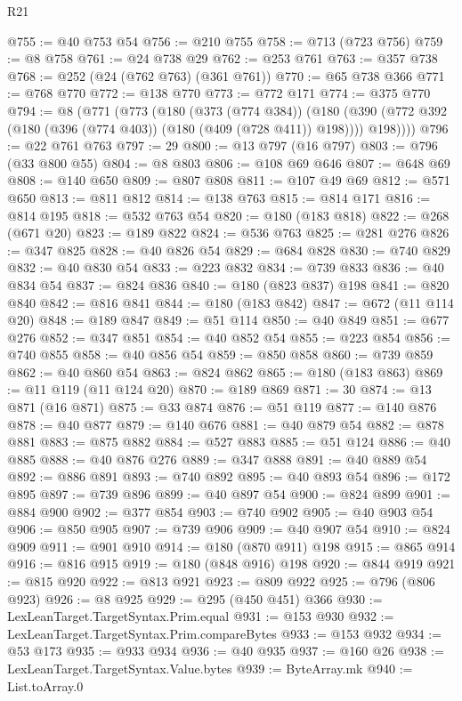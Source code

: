 \begin{lexlean}{R21}
\begin{coremodule}
@755 := @40 @753 @54
@756 := @210 @755
@758 := @713 (@723 @756)
@759 := @8 @758
@761 := @24 @738 @29
@762 := @253 @761
@763 := @357 @738
@768 := @252 (@24 (@762 @763) (@361 @761))
@770 := @65 @738 @366
@771 := @768 @770
@772 := @138 @770
@773 := @772 @171
@774 := @375 @770
@794 := @8
    (@771
      (@773
        (@180
          (@373 (@774 @384))
          (@180 (@390 (@772 @392 (@180 (@396 (@774 @403)) (@180 (@409 (@728 @411)) @198)))) @198))))
@796 := @22 @761 @763
@797 := 29
@800 := @13 @797 (@16 @797)
@803 := @796 (@33 @800 @55)
@804 := @8 @803
@806 := @108 @69 @646
@807 := @648 @69
@808 := @140 @650
@809 := @807 @808
@811 := @107 @49 @69
@812 := @571 @650
@813 := @811 @812
@814 := @138 @763
@815 := @814 @171
@816 := @814 @195
@818 := @532 @763 @54
@820 := @180 (@183 @818)
@822 := @268 (@671 @20)
@823 := @189 @822
@824 := @536 @763
@825 := @281 @276
@826 := @347 @825
@828 := @40 @826 @54
@829 := @684 @828
@830 := @740 @829
@832 := @40 @830 @54
@833 := @223 @832
@834 := @739 @833
@836 := @40 @834 @54
@837 := @824 @836
@840 := @180 (@823 @837) @198
@841 := @820 @840
@842 := @816 @841
@844 := @180 (@183 @842)
@847 := @672 (@11 @114 @20)
@848 := @189 @847
@849 := @51 @114
@850 := @40 @849
@851 := @677 @276
@852 := @347 @851
@854 := @40 @852 @54
@855 := @223 @854
@856 := @740 @855
@858 := @40 @856 @54
@859 := @850 @858
@860 := @739 @859
@862 := @40 @860 @54
@863 := @824 @862
@865 := @180 (@183 @863)
@869 := @11 @119 (@11 @124 @20)
@870 := @189 @869
@871 := 30
@874 := @13 @871 (@16 @871)
@875 := @33 @874
@876 := @51 @119
@877 := @140 @876
@878 := @40 @877
@879 := @140 @676
@881 := @40 @879 @54
@882 := @878 @881
@883 := @875 @882
@884 := @527 @883
@885 := @51 @124
@886 := @40 @885
@888 := @40 @876 @276
@889 := @347 @888
@891 := @40 @889 @54
@892 := @886 @891
@893 := @740 @892
@895 := @40 @893 @54
@896 := @172 @895
@897 := @739 @896
@899 := @40 @897 @54
@900 := @824 @899
@901 := @884 @900
@902 := @377 @854
@903 := @740 @902
@905 := @40 @903 @54
@906 := @850 @905
@907 := @739 @906
@909 := @40 @907 @54
@910 := @824 @909
@911 := @901 @910
@914 := @180 (@870 @911) @198
@915 := @865 @914
@916 := @816 @915
@919 := @180 (@848 @916) @198
@920 := @844 @919
@921 := @815 @920
@922 := @813 @921
@923 := @809 @922
@925 := @796 (@806 @923)
@926 := @8 @925
@929 := @295 (@450 @451) @366
@930 := LexLeanTarget.TargetSyntax.Prim.equal
@931 := @153 @930
@932 := LexLeanTarget.TargetSyntax.Prim.compareBytes
@933 := @153 @932
@934 := @53 @173
@935 := @933 @934
@936 := @40 @935
@937 := @160 @26
@938 := LexLeanTarget.TargetSyntax.Value.bytes
@939 := ByteArray.mk
@940 := List.toArray.{0}

\end{coremodule}
\end{lexlean}
